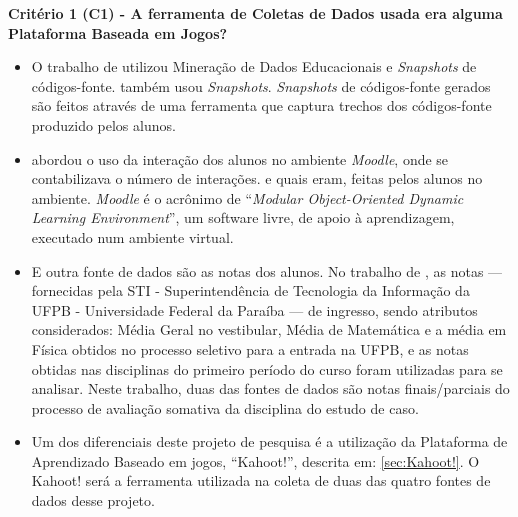 \documentclass[
	12pt,				%
	openright,			%
	oneside,
	a4paper,			%
	english,			%
	french,				%
	spanish,			%
	brazil,				%
	]{abntex2}
\begin{document}

\textbf{Critério 1 (C1) - A ferramenta de Coletas de Dados usada era alguma Plataforma Baseada em Jogos?}

\begin{itemize}
    \item O trabalho de  utilizou Mineração de Dados Educacionais e \textit{Snapshots} de códigos-fonte.  também usou \textit{Snapshots}. \textit{Snapshots} de códigos-fonte gerados são feitos através de uma ferramenta que captura trechos dos códigos-fonte produzido pelos alunos.
    \item {} abordou o uso da interação dos alunos no ambiente \textit{Moodle}, onde se contabilizava o número de interações. e quais eram, feitas pelos alunos no ambiente. \textit{Moodle} é o acrônimo de ``\textit{Modular Object-Oriented Dynamic Learning Environment}'', um software livre, de apoio à aprendizagem, executado num ambiente virtual.
    \item E outra fonte de dados são as notas dos alunos. No trabalho de , as notas --- fornecidas pela STI - Superintendência de Tecnologia da Informação da UFPB - Universidade Federal da Paraíba --- de ingresso, sendo atributos considerados: Média Geral no vestibular, Média de Matemática e a média em Física obtidos no processo seletivo para a entrada na UFPB, e as notas obtidas nas disciplinas do primeiro período do curso foram utilizadas para se analisar. Neste trabalho, duas das fontes de dados são notas finais/parciais do processo de avaliação somativa da disciplina do estudo de caso.
    \item Um dos diferenciais deste projeto de pesquisa é a utilização da Plataforma de Aprendizado Baseado em jogos, ``Kahoot!'', descrita em: \ref{sec:Kahoot!}. O Kahoot! será a ferramenta utilizada na coleta de duas das quatro fontes de dados desse projeto.
\end{itemize}
\end{document}

